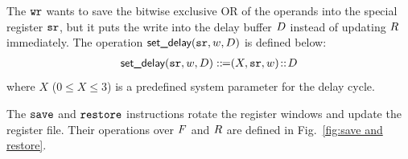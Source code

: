 The $\texttt{wr}$ wants to save the bitwise exclusive OR of
the operands into the special register $\texttt{sr}$, but
it puts the write into the delay buffer $D$
instead of updating $R$ immediately.
The operation $\textsf{set\_delay}(\texttt{sr}, w, D)$
is defined below:
\[
	\begin{array}{l}
		\textsf{set\_delay}(\texttt{sr}, w, D) ::\!\!{=} (X, \texttt{sr}, w)
		\!::\! D \\
	\end{array}
\]
where $X$ ($0 \leq X \leq 3$) is a
predefined system parameter for the delay cycle.

The $\texttt{save}$ and $\texttt{restore}$ instructions rotate
the register windows and update the register file.
Their operations over $F$ and $R$
are defined in Fig.~\ref{fig:save and restore}.

%
%
%

